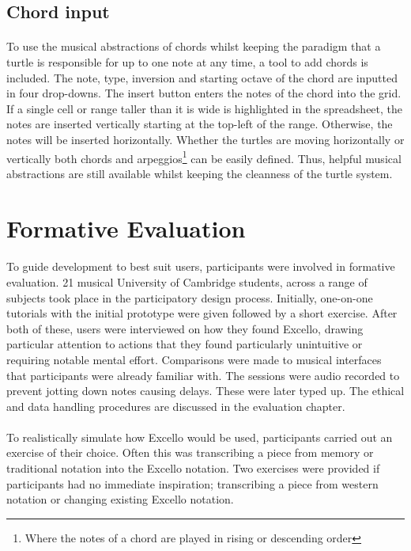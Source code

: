 \subsection{Chord input}

\paragraph{} To use the musical abstractions of chords whilst keeping the paradigm that a turtle is responsible for up to one note at any time, a tool to add chords is included. The note, type, inversion and starting octave of the chord are inputted in four drop-downs. The insert button enters the notes of the chord into the grid. If a single cell or range taller than it is wide is highlighted in the spreadsheet, the notes are inserted vertically starting at the top-left of the range. Otherwise, the notes will be inserted horizontally. Whether the turtles are moving horizontally or vertically both chords and arpeggios\footnote{Where the notes of a chord are played in rising or descending order} can be easily defined. Thus, helpful musical abstractions are still available whilst keeping the cleanness of the turtle system.

\section{Formative Evaluation}

\paragraph{} To guide development to best suit users, participants were involved in formative evaluation. 21 musical University of Cambridge students, across a range of subjects took place in the participatory design process. Initially, one-on-one tutorials with the initial prototype were given followed by a short exercise. After both of these, users were interviewed on how they found Excello, drawing particular attention to actions that they found particularly unintuitive or requiring notable mental effort. Comparisons were made to musical interfaces that participants were already familiar with. The sessions were audio recorded to prevent jotting down notes causing delays. These were later typed up. The ethical and data handling procedures are discussed in the evaluation chapter.

\paragraph{} To realistically simulate how Excello would be used, participants carried out an exercise of their choice. Often this was transcribing a piece from memory or traditional notation into the Excello notation. Two exercises were provided if participants had no immediate inspiration; transcribing a piece from western notation or changing existing Excello notation.

